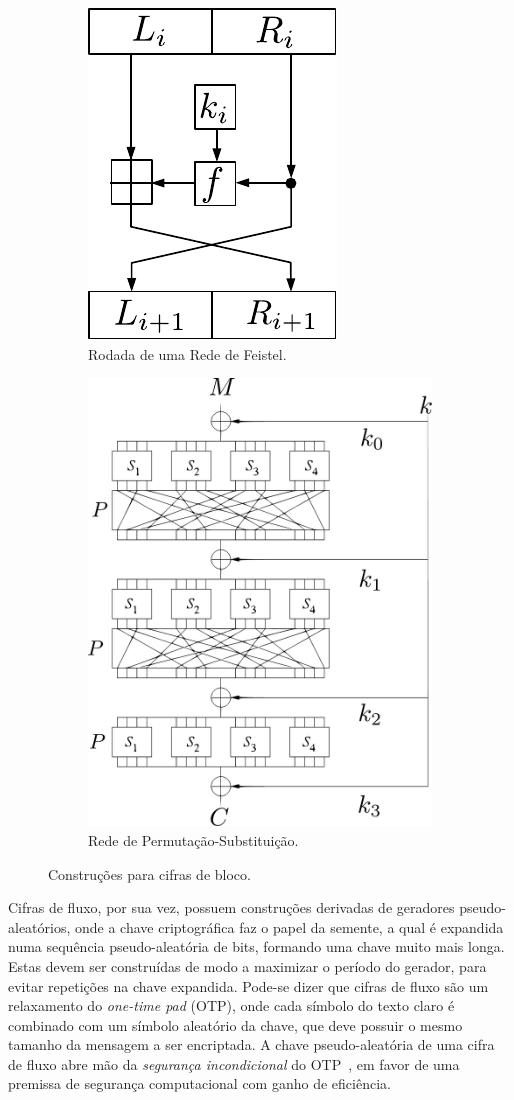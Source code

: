 \begin{figure}[htbp]
\centering
\begin{subfigure}{.5\textwidth}
  \centering
  \includegraphics[width=.4\linewidth]{figures/feistel.pdf}
  \caption{Rodada de uma Rede de Feistel.}
  \label{fig:feistel}
\end{subfigure}%
\begin{subfigure}{.5\textwidth}
  \centering
  \includegraphics[width=.7\linewidth]{figures/spn.pdf}
  \caption{Rede de Permutação-Substituição.}
  \label{fig:spn}
\end{subfigure}
\caption{Construções para cifras de bloco.}
\label{fig:bloco}
\end{figure}

Cifras de fluxo, por sua vez, possuem construções derivadas de geradores pseudo-aleatórios, onde a chave criptográfica faz o papel da semente, a qual é expandida numa sequência pseudo-aleatória de bits, formando uma chave muito mais longa. Estas devem ser construídas de modo a maximizar o período do gerador, para evitar repetições na chave expandida. Pode-se dizer que cifras de fluxo são um relaxamento do \emph{one-time pad} (OTP), onde cada símbolo do texto claro é combinado com um símbolo aleatório da chave, que deve possuir o mesmo tamanho da mensagem a ser encriptada. A chave pseudo-aleatória de uma cifra de fluxo abre mão da \emph{segurança incondicional} do OTP~\cite{Shannon49}, em favor de uma premissa de segurança computacional com ganho de eficiência.

